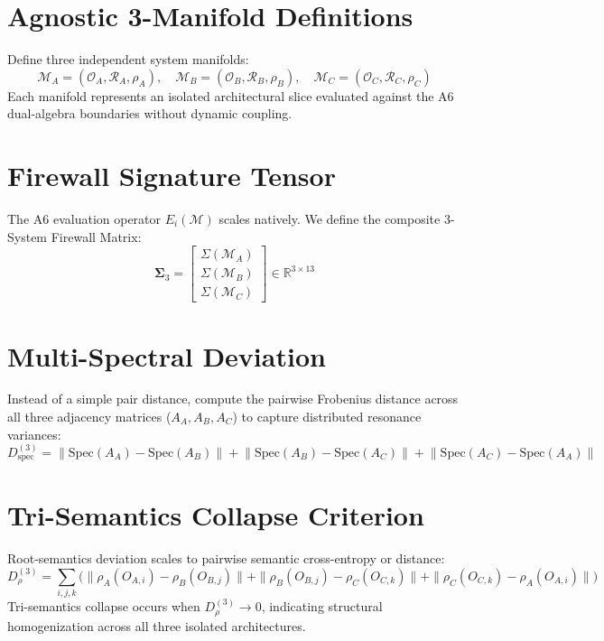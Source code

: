 \section{Agnostic 3-Manifold Definitions}
Define three independent system manifolds:
\[
\mathcal{M}_A = (\mathcal{O}_A, \mathcal{R}_A, \rho_A), \quad
\mathcal{M}_B = (\mathcal{O}_B, \mathcal{R}_B, \rho_B), \quad
\mathcal{M}_C = (\mathcal{O}_C, \mathcal{R}_C, \rho_C)
\]
Each manifold represents an isolated architectural slice evaluated against the A6 dual-algebra boundaries without dynamic coupling.

\section{Firewall Signature Tensor}
The A6 evaluation operator $E_i(\mathcal{M})$ scales natively. We define the composite 3-System Firewall Matrix:
\[
\mathbf{\Sigma}_{3} = \begin{bmatrix}
\Sigma(\mathcal{M}_A) \\
\Sigma(\mathcal{M}_B) \\
\Sigma(\mathcal{M}_C)
\end{bmatrix} \in \mathbb{R}^{3 \times 13}
\]

\section{Multi-Spectral Deviation}
Instead of a simple pair distance, compute the pairwise Frobenius distance across all three adjacency matrices ($A_A, A_B, A_C$) to capture distributed resonance variances:
\[
D_{\mathrm{spec}}^{(3)} = \left\| \mathrm{Spec}(A_A) - \mathrm{Spec}(A_B) \right\| + \left\| \mathrm{Spec}(A_B) - \mathrm{Spec}(A_C) \right\| + \left\| \mathrm{Spec}(A_C) - \mathrm{Spec}(A_A) \right\|
\]

\section{Tri-Semantics Collapse Criterion}
Root-semantics deviation scales to pairwise semantic cross-entropy or distance:
\[
D_{\rho}^{(3)} = \sum_{i,j,k} \Big( \|\rho_A(O_{A,i}) - \rho_B(O_{B,j})\| + \|\rho_B(O_{B,j}) - \rho_C(O_{C,k})\| + \|\rho_C(O_{C,k}) - \rho_A(O_{A,i})\| \Big)
\]
Tri-semantics collapse occurs when $D_{\rho}^{(3)} \to 0$, indicating structural homogenization across all three isolated architectures.
